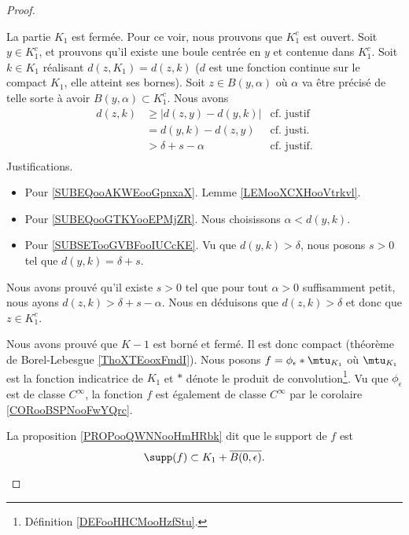 \begin{proof}
\begin{subproof}
		La partie \( K_1\) est fermée. Pour ce voir, nous prouvons que \( K_1^c\) est ouvert. Soit \( y\in K_1^c\), et prouvons qu'il existe une boule centrée en \( y\) et contenue dans \( K_1^c\). Soit \( k\in K_1\) réalisant \( d(z,K_1)=d(z,k)\) (\( d\) est une fonction continue sur le compact \( K_1\), elle atteint ses bornes). Soit \( z\in B(y,\alpha)\) où \( \alpha\) va être précisé de telle sorte à avoir \( B(y,\alpha)\subset K_1^c\). Nous avons
		\begin{subequations}
			\begin{align}
				d(z,k) & \geq | d(z,y)-d(y,k) | & \text{cf. justif}		\label{SUBEQooAKWEooGpnxaX}   \\
				       & =d(y,k)-d(z,y)         & \text{cf. justi.}	\label{SUBEQooGTKYooEPMjZR}   \\
				       & > \delta+s-\alpha      & \text{cf. justif.}\label{SUBSETooGVBFooIUCcKE} \\
			\end{align}
		\end{subequations}
		Justifications.
		\begin{itemize}
			\item Pour \eqref{SUBEQooAKWEooGpnxaX}. Lemme \ref{LEMooXCXHooVtrkvl}.
			\item Pour \eqref{SUBEQooGTKYooEPMjZR}. Nous choisissons \( \alpha<d(y,k)\).
			\item Pour \ref{SUBSETooGVBFooIUCcKE}. Vu que \( d(y,k)>\delta\), nous posons \( s>0\) tel que \( d(y,k)=\delta+s\).
		\end{itemize}
		Nous avons prouvé qu'il existe \( s>0\) tel que pour tout \( \alpha>0\) suffisamment petit, nous ayons \( d(z,k)>\delta+s-\alpha\). Nous en déduisons que \( d(z,k)>\delta\) et donc que \( z\in K_1^c\).

		Nous avons prouvé que \( K-1\) est borné et fermé. Il est donc compact (théorème de Borel-Lebesgue \ref{ThoXTEooxFmdI}).
		\spitem[La fonction \( f\)]
		Nous posons \( f=\phi_{\epsilon}*\mtu_{K_1}\) où \( \mtu_{K_1}\) est la fonction indicatrice de \( K_1\) et \( *\) dénote le produit de convolution\footnote{Définition \ref{DEFooHHCMooHzfStu}.}. Vu que \( \phi_{\epsilon}\) est de classe \( C^{\infty}\), la fonction \( f\) est également de classe \( C^{\infty}\) par le corolaire \ref{CORooBSPNooFwYQrc}.

		La proposition \ref{PROPooQWNNooHmHRbk} dit que le support de \( f\) est
		\begin{equation}
			\supp(f)\subset K_1+\overline{B(0,\epsilon)}.
		\end{equation}


\end{subproof}
\end{proof}
